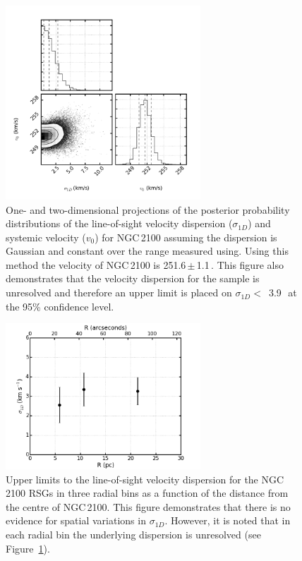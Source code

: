 \begin{figure}
\centering
 \includegraphics[width=0.65\textwidth]{ngc2100/NGC2100-sigRV-triangle}
 \caption[One- and two-dimensional projections of $\sigma_{1D}$ and $v_{0}$]{One- and two-dimensional projections of the posterior probability distributions of the line-of-sight velocity dispersion ($\sigma_{1D}$) and systemic velocity ($v_{0}$) for NGC\,2100 assuming the dispersion is Gaussian and constant over the range measured using.
 Using this method the velocity of NGC\,2100 is 251.6\,$\pm$\,1.1\,\kms.
 This figure also demonstrates that the velocity dispersion for the sample is unresolved and therefore an upper limit is placed on $\sigma_{1D} <$~3.9\,\kms~at the 95\% confidence level.
\label{fig:sig1d}
          }
\end{figure}

\begin{figure}
\centering
 \includegraphics[width=0.65\textwidth]{ngc2100/NGC2100-sig1d-bins}
 \caption[$\sigma_{1D}$ as a function of radial distance from the cluster centre]{Upper limits to the line-of-sight velocity dispersion for the NGC\,2100 RSGs in three radial bins as a function of the distance from the centre of NGC\,2100.
 This figure demonstrates that there is no evidence for spatial variations in $\sigma_{1D}$.
 However, it is noted that in each radial bin the underlying dispersion is unresolved (see Figure~\ref{fig:sig1d}).
\label{fig:sig1dbins}
          }
\end{figure}

